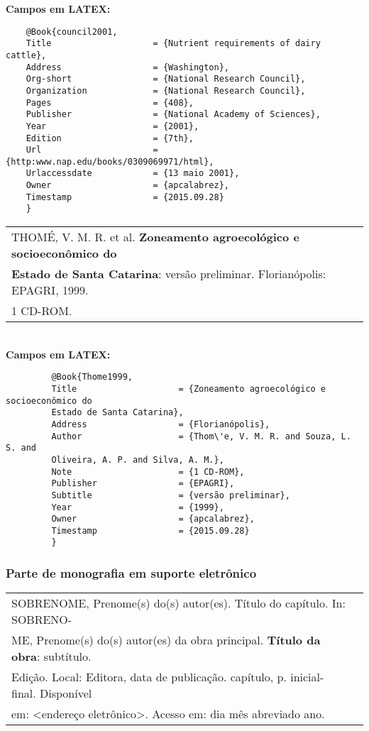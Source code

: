 	 \textbf{Campos em LATEX:} 
	 
	 \begin{verbatim}
	@Book{council2001,
	Title                    = {Nutrient requirements of dairy cattle},
	Address                  = {Washington},
	Org-short                = {National Research Council},
	Organization             = {National Research Council},
	Pages                    = {408},
	Publisher                = {National Academy of Sciences},
	Year                     = {2001},
	Edition                  = {7th},
	Url                      = {http:www.nap.edu/books/0309069971/html},
	Urlaccessdate            = {13 maio 2001},
	Owner                    = {apcalabrez},
	Timestamp                = {2015.09.28}
	}
	 \end{verbatim}
	 
	 
	 	  \begin{tabular}{|l|c|} \hline
	 	 THOMÉ, V. M. R. et al. \textbf{Zoneamento agroecológico e socioeconômico do } \\ \textbf{Estado de Santa Catarina}:  versão preliminar. Florianópolis: EPAGRI, 1999. \\1 CD-ROM.  \\\hline
	 	 \end{tabular} \\ 
	 	 
	 	 \textbf{Campos em LATEX:} 
	 	 
	 	 \begin{verbatim}
	 	 @Book{Thome1999,
	 	 Title                    = {Zoneamento agroecológico e socioeconômico do 
	 	 Estado de Santa Catarina},
	 	 Address                  = {Florianópolis},
	 	 Author                   = {Thom\'e, V. M. R. and Souza, L. S. and 
	 	 Oliveira, A. P. and Silva, A. M.},
	 	 Note                     = {1 CD-ROM},
	 	 Publisher                = {EPAGRI},
	 	 Subtitle                 = {versão preliminar},
	 	 Year                     = {1999},
	 	 Owner                    = {apcalabrez},
	 	 Timestamp                = {2015.09.28}
	 	 }
	 	 \end{verbatim}
	 \subsubsection{Parte de monografia em suporte eletrônico}
	  	  
	   \begin{tabular}{|l|c|} \hline
	   	SOBRENOME, Prenome(s) do(s) autor(es). Título do capítulo. In:
	   	SOBRENO-\\ME, Prenome(s)  do(s) autor(es) da obra principal.  \textbf{Título da obra}: subtítulo. \\Edição. Local: Editora, data de publicação. capítulo, p. inicial-final. Disponível \\em: <endereço eletrônico>. Acesso em: dia mês abreviado ano.  \\\hline
	   \end{tabular} \\ 
	   
